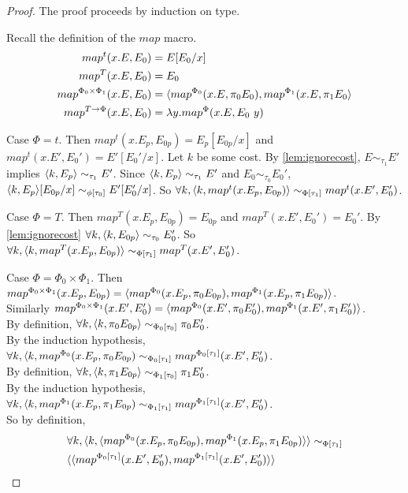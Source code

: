 \begin{proof}
  The proof proceeds by induction on type.

  Recall the definition of the $map$ macro.
  \begin{align*}
    map^t(x.E, E_0) &= E[E_0/x]                                                                                       \\
    map^T(x.E, E_0) &= E_0                                                                                            \\
    map^{\Phi_0 \times \Phi_1}(x.E, E_0) &= \langle map^{\Phi_0}(x.E, \pi_0 E_0), map^{\Phi_1}(x.E, \pi_1 E_0 \rangle \\
    map^{T \to \Phi}(x.E, E_0) &= \lambda y.map^\Phi(x.E, E_0\ y)
  \end{align*}

  Case $\Phi = t$.
  Then $map^t(x.E_p, E_{0p}) = E_p[E_{0p}/x]$ and $map^t(x.E', E_0') = E'[E_0'/x]$.
  Let $k$ be some cost.
  By \ref{lem:ignorecost}, $E \sim_{\tau_1} E'$ implies $\langle k, E_p \rangle \sim_{\tau_1} E'$.
  Since $\langle k, E_p \rangle \sim_{\tau_1} E'$ and $E_0 \sim_{\tau_0} E_0'$, $\langle k, E_p \rangle [E_{0p}/x] \sim_{\phi[\tau_0]} E'[E_0'/x]$.
  So $\forall k, \langle k, map^t(x.E_p, E_{0p}) \rangle \sim_{\Phi[\tau_1]} map^t(x.E', E_0')$.

  Case $\Phi = T$.
  Then $map^T(x.E_p, E_{0p}) = E_{0p}$ and $map^T(x.E', E_0') = E_0'$.
  By \ref{lem:ignorecost} $\forall k, \langle k, E_{0p} \rangle \sim_{\tau_0} E_0'$.
  So $\forall k, \langle k, map^T(x.E_p, E_{0p}) \rangle \sim_{\Phi[\tau_1]} map^T(x.E', E_0')$.

  Case $\Phi = \Phi_0 \times \Phi_1$.
  Then \\
  $map^{\Phi_0 \times \Phi_1}(x. E_p, E_{0p}) = \langle map^{\Phi_0}(x. E_p, \pi_0 E_{0p}), map^{\Phi_1}(x. E_p, \pi_1 E_{0p}) \rangle$.\\
  Similarly $map^{\Phi_0 \times \Phi_1}(x. E', E_0') = \langle map^{\Phi_0}(x. E', \pi_0 E_0'), map^{\Phi_1}(x. E', \pi_1 E_0') \rangle$.\\
  By definition, $\forall k, \langle k, \pi_0 E_{0p} \rangle \sim_{\Phi_0[\tau_0]} \pi_0 E_0'$.\\
  By the induction hypothesis, $\forall k, \langle k, map^{\Phi_0}(x. E_p, \pi_0 E_{0p}) \sim_{\Phi_0[\tau_1]} map^{\Phi_0[\tau_1]}(x. E', E_0')$.\\
  By definition, $\forall k, \langle k, \pi_1 E_{0p} \rangle \sim_{\Phi_1[\tau_0]} \pi_1 E_0'$.\\
  By the induction hypothesis, $\forall k, \langle k, map^{\Phi_1}(x. E_p, \pi_1 E_{0p}) \sim_{\Phi_1[\tau_1]} map^{\Phi_1[\tau_1]}(x. E', E_0')$.\\
  So by definition,
  \begin{align*}
    &\forall k, \langle k, \langle map^{\Phi_0}(x. E_p, \pi_0 E_{0p}), map^{\Phi_1}(x. E_p, \pi_1 E_{0p}) \rangle \rangle \sim_{\Phi[\tau_1]}  \\
    &\langle \langle map^{\Phi_0[\tau_1]}(x. E', E_0'), map^{\Phi_1[\tau_1]}(x. E', E_0') \rangle \rangle
  \end{align*}


\end{proof}
